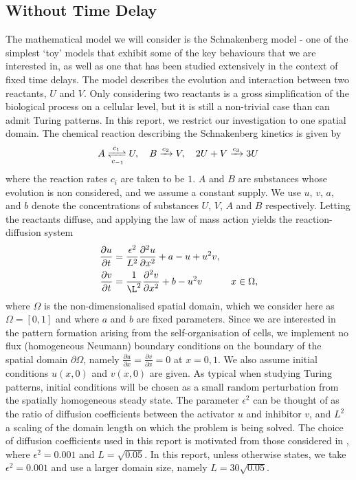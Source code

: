 \subsection{Without Time Delay}
The mathematical model we will consider is the Schnakenberg model \cite{schnakenberg} - one of the simplest `toy' models that exhibit some of the key behaviours that we are interested in, as well as one that has been studied extensively in the context of fixed time delays. The model describes the evolution and interaction between two reactants, $U$ and $V$. Only considering two reactants is a gross simplification of the biological process on a cellular level, but it is still a non-trivial case than can admit Turing patterns. In this report, we restrict our investigation to one spatial domain. The chemical reaction describing the Schnakenberg kinetics is given by \cite{baker}
\begin{equation}\label{chem}
A\xrightleftharpoons[c_{-1}]{c_1} U,\quad B\xrightarrow{c_2} V,\quad 2U+V\xrightarrow{c_3} 3U
\end{equation}
where the reaction rates $c_i$ are taken to be $1$. $A$ and $B$ are substances whose evolution is non considered, and we assume a constant supply. We use $u$, $v$, $a$, and $b$ denote the concentrations of substances $U$, $V$, $A$ and $B$ respectively. Letting the reactants diffuse, and applying the law of mass action yields the reaction-diffusion system
\begin{equation}\label{system}
    \begin{split}
    \frac{\partial u}{\partial t}&=\frac{\epsilon^2}{L^2}\frac{\partial^2 u}{\partial x^2}+a-u+u^2v,\\
    \frac{\partial v}{\partial t}&=\frac{1}{\L^2}\frac{\partial^2 v}{\partial x^2}+b-u^2v \quad\quad\quad x\in\Omega,
    \end{split}
\end{equation}
where $\Omega$ is the non-dimensionalised spatial domain, which we consider here as $\Omega=[0,1]$ and where $a$ and $b$ are fixed parameters. Since we are interested in the pattern formation arising from the self-organisation of cells, we implement no flux (homogeneous Neumann) boundary conditions on the boundary of the spatial domain $\partial\Omega$, namely $\frac{\partial u}{\partial x}=\frac{\partial v}{\partial x}=0$ at $x=0, 1$. We also assume initial conditions $u(x,0)$ and $v(x,0)$ are given. As typical when studying Turing patterns, initial conditions will be chosen as a small random perturbation from the spatially homogeneous steady state. The parameter $\epsilon^2$ can be thought of as the ratio of diffusion coefficients between the activator $u$ and inhibitor $v$, and $L^2$ a scaling of the domain length on which the problem is being solved. The choice of diffusion coefficients used in this report is motivated from those considered in \cite{gaffmonk}, where $\epsilon^2=0.001$ and $L=\sqrt{0.05}$. In this report, unless otherwise states, we take $\epsilon^2=0.001$ and use a larger domain size, namely $L=30\sqrt{0.05}$.


